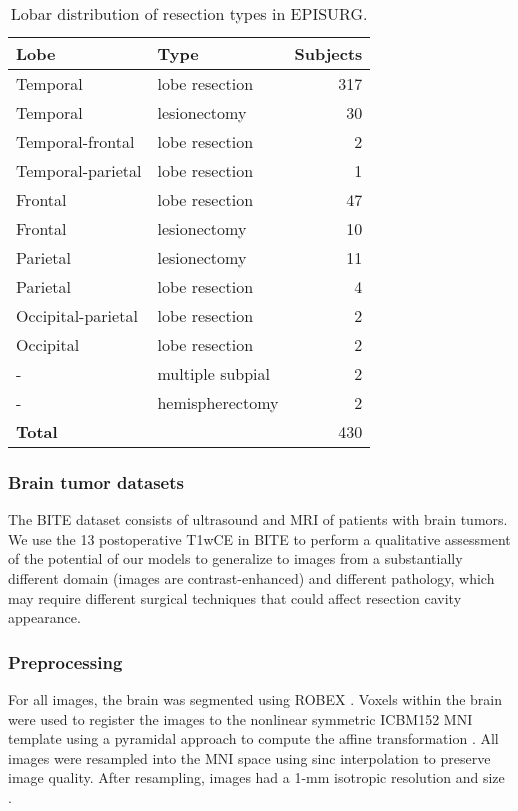\begin{table}
  \centering
  \caption{
    Lobar distribution of resection types in EPISURG.
  }
  \label{tab:episurg}
  \begin{tabular}{llr}
    \toprule
    \textbf{Lobe}      & \textbf{Type}    & \textbf{Subjects} \\
    \midrule
    Temporal           & lobe resection   &        317 \\
    Temporal           & lesionectomy     &         30 \\
    Temporal-frontal   & lobe resection   &          2 \\
    Temporal-parietal  & lobe resection   &          1 \\
    Frontal            & lobe resection   &         47 \\
    Frontal            & lesionectomy     &         10 \\
    Parietal           & lesionectomy     &         11 \\
    Parietal           & lobe resection   &          4 \\
    Occipital-parietal & lobe resection   &          2 \\
    Occipital          & lobe resection   &          2 \\
    -                  & multiple subpial &          2 \\
    -                  & hemispherectomy  &          2 \\
    \midrule
    \textbf{Total}     &                  &        430 \\
    \bottomrule
  \end{tabular}
\end{table}



\subsubsection{Brain tumor datasets}

The \ac{BITE} dataset \cite{mercier_online_2012} consists of ultrasound and \ac{MRI} of patients with brain tumors.
We use the 13 postoperative \ac{T1wCE} in \ac{BITE} to perform a qualitative assessment of the potential of our models to generalize to images from a substantially different domain (images are contrast-enhanced) and different pathology, which may require different surgical techniques that could affect resection cavity appearance.



\subsubsection{Preprocessing}
\label{sec:preprocessing}

For all images, the brain was segmented using ROBEX \cite{iglesias_robust_2011}.
Voxels within the brain were used to register the images to the nonlinear symmetric ICBM152 \ac{MNI} template \cite{fonov_unbiased_2009,fonov_unbiased_2011} using a pyramidal approach to compute the affine transformation \cite{modat_global_2014}.
All images were resampled into the \ac{MNI} space using sinc interpolation to preserve image quality.
After resampling, images had a 1-mm isotropic resolution and size .
